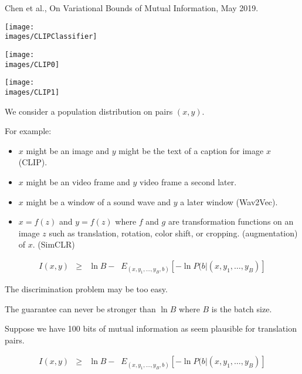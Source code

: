 {Chen et al., On Variational Bounds of Mutual Information, May 2019.


\centerline{\texttt{[image: \\images/CLIPClassifier]}}


\centerline{\texttt{[image: \\images/CLIP0]}}


\centerline{\texttt{[image: \\images/CLIP1]}}


 We consider a population distribution on pairs $(x,y)$.
 
 \vfill
 For example:
 
 \vfill
\begin{itemize}
\item $x$ might be an image and $y$ might be the text of a caption for image $x$ (CLIP).

\vfill
\item $x$ might be an video frame and $y$ video frame a second later.

\vfill
\item $x$ might be a window of a sound wave and $y$ a later window (Wav2Vec).

\vfill
\item $x = f(z)$ and $y = f(z)$ where $f$ and $g$ are transformation functions on an image $z$ such as  translation, rotation, color shift, or cropping. (augmentation) of $x$. (SimCLR)
\end{itemize}



{\huge
\begin{eqnarray*}
I(x,y) & \geq & \ln B - \;\;E_{(x,y_1,\ldots,y_B,b)}\left[-\ln P(b|(x,y_1,\ldots,y_B)\right]
\end{eqnarray*}
}

The discrimination problem may be too easy.

\vfill
The guarantee can never be stronger than $\ln B$ where $B$ is the batch size.

\vfill
Suppose we have 100 bits of mutual information as seem plausible for translation pairs.


\begin{eqnarray*}
I(x,y) & \geq & \ln B - \;\;E_{(x,y_1,\ldots,y_B,b)}\left[-\ln P(b|(x,y_1,\ldots,y_B)\right]
\end{eqnarray*}

}
